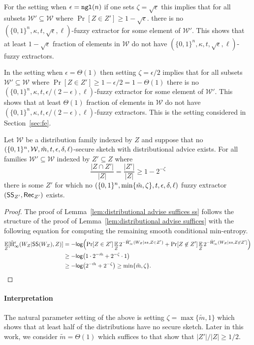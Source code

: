 For the setting when $\epsilon = \mathtt{ngl}(n)$  if one sets $\zeta = \sqrt{\epsilon}$ this implies that for all subsets $\mathcal{W}' \subseteq \mathcal{W}$ where $\Pr[Z\in Z']\ge 1-\sqrt{\epsilon}.$ there is no $(\{0,1\}^n,\kappa, t, \sqrt{\epsilon}, \ell)$-fuzzy extractor for some element of $\mathcal{W}'$.  This shows that at least $1-\sqrt{\epsilon}$ fraction of elements in $\mathcal{W}$ do not have $(\{0,1\}^n,\kappa, t, \sqrt{\epsilon}, \ell)$-fuzzy extractors.

In the setting when $\epsilon = \Theta(1)$ then setting $\zeta = \epsilon/2$ implies that for all subsets $\mathcal{W}' \subseteq \mathcal{W}$ where $\Pr[Z\in Z']\ge 1-\epsilon/2 = 1-\Theta(1)$ there is no $(\{0,1\}^n,\kappa, t, \epsilon/(2-\epsilon), \ell)$-fuzzy extractor for some element of $\mathcal{W}'$.  This shows that at least $\Theta(1)$ fraction of elements in $\mathcal{W}$ do not have $(\{0,1\}^n,\kappa, t, \epsilon/(2-\epsilon), \ell)$-fuzzy extractors. This is the setting considered in Section~\ref{sec:fe}.


\begin{lemma}
Let $\mathcal{W}$ be a distribution family indexed by $Z$ and suppose that no $(\{0, 1\}^n, \mathcal{W}, \tilde{m}, t, \epsilon, \delta, \ell)$-secure sketch with distributional advice exists.  For all families $\mathcal{W}'\subseteq \mathcal{W}$ indexed by $Z'\subseteq Z$ where\[\frac{|Z\cap Z'|}{|Z|} = \frac{|Z'|}{|Z|}\ge 1-2^{-\zeta}\]
there is some $Z'$ for which no  $(\{0, 1\}^n, \min\{\tilde{m}, \zeta\}, t, \epsilon, \delta, \ell)$ fuzzy extractor $({\mathsf{SS}}_{Z'}, {\mathsf{Rec}}_{Z'})$  exists.
\label{lem:distributional advise suffices ss}
\end{lemma}

\begin{proof}
The proof of Lemma~\ref{lem:distributional advise suffices ss} follows the structure of the proof of Lemma~\ref{lem:distributional advise suffices} with the following equation for computing the remaining smooth conditional min-entropy.
\begin{align*}
\operatorname*{\mathbb{E}}_{Z} [\tilde{\mathrm{H}}_\infty^\epsilon(W_Z| {\mathsf{SS}}(W_Z), Z)] &= -\mathsf{log}\!\left(\Pr[Z\in Z']\operatorname*{\mathbb{E}}_{Z} 2^{-\tilde{\mathrm{H}}_\infty^\epsilon(W_Z| ss, Z\in Z')}+ \Pr[Z\not\in Z']\operatorname*{\mathbb{E}}_{Z} 2^{-\tilde{\mathrm{H}}_\infty^\epsilon(W_Z| ss, Z\not\in Z'] }\right)\\
&\ge -\mathsf{log}\!\left(1 \cdot 2^{-\tilde{m}}+ 2^{-\zeta}\cdot 1\right)\\
&\ge -\mathsf{log}\!\left(2^{-\tilde{m}}+2^{-\zeta}\right)  \ge \min\{\tilde{m},\zeta\}.
\end{align*}
\end{proof}

\paragraph{Interpretation}
The natural parameter setting of the above is setting $\zeta = \max\{\tilde{m},1\} $ which shows that at least half of the distributions have no secure sketch.  Later in this work, we consider $\tilde{m} = \Theta(1)$ which suffices to that show that  $|Z'|/|Z|\ge 1/2$.




